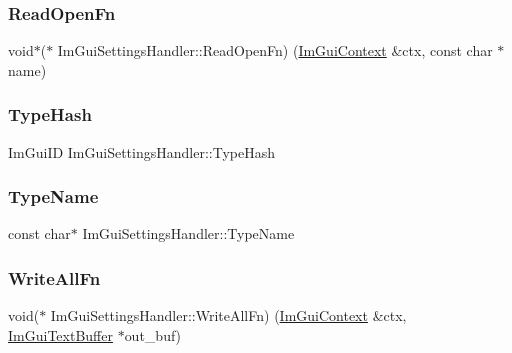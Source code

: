 \hypertarget{struct_im_gui_settings_handler_a695060dab855d36def9e46ec78432429}{}\label{struct_im_gui_settings_handler_a695060dab855d36def9e46ec78432429} 
\subsubsection{\texorpdfstring{Read\+Open\+Fn}{ReadOpenFn}}
{\footnotesize\ttfamily void$\ast$($\ast$ Im\+Gui\+Settings\+Handler\+::\+Read\+Open\+Fn) (\hyperlink{struct_im_gui_context}{Im\+Gui\+Context} \&ctx, const char $\ast$name)}

\hypertarget{struct_im_gui_settings_handler_ac2dd47bdb91ae6f50afb5ac14222b552}{}\label{struct_im_gui_settings_handler_ac2dd47bdb91ae6f50afb5ac14222b552} 
\subsubsection{\texorpdfstring{Type\+Hash}{TypeHash}}
{\footnotesize\ttfamily Im\+Gui\+ID Im\+Gui\+Settings\+Handler\+::\+Type\+Hash}

\hypertarget{struct_im_gui_settings_handler_a2b2821603e32a669c855dd97757c83c8}{}\label{struct_im_gui_settings_handler_a2b2821603e32a669c855dd97757c83c8} 
\subsubsection{\texorpdfstring{Type\+Name}{TypeName}}
{\footnotesize\ttfamily const char$\ast$ Im\+Gui\+Settings\+Handler\+::\+Type\+Name}

\hypertarget{struct_im_gui_settings_handler_a2c8cb2bd0c8275e910239672a0278cfd}{}\label{struct_im_gui_settings_handler_a2c8cb2bd0c8275e910239672a0278cfd} 
\subsubsection{\texorpdfstring{Write\+All\+Fn}{WriteAllFn}}
{\footnotesize\ttfamily void($\ast$ Im\+Gui\+Settings\+Handler\+::\+Write\+All\+Fn) (\hyperlink{struct_im_gui_context}{Im\+Gui\+Context} \&ctx, \hyperlink{struct_im_gui_text_buffer}{Im\+Gui\+Text\+Buffer} $\ast$out\+\_\+buf)}

